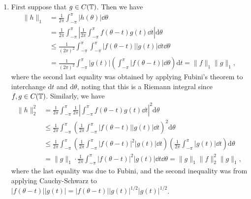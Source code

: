 \begin{pf}
\begin{enumerate}[(1)]
        \item First suppose that $g \in C(\mathbb{T})$. Then we have 
        \begin{align*}
            \|h\|_1 &= \frac{1}{2\pi} \int_{-\pi}^\pi |h(\theta)|\dd \theta \\ 
            &= \frac{1}{2\pi} \int_{-\pi}^\pi \left| \frac{1}{2\pi} \int_{-\pi}^\pi f(\theta - t) g(t)\dd t \right|\textrm{d}\theta \\ 
            &\leq \frac{1}{(2\pi)^2} \int_{-\pi}^\pi \int_{-\pi}^\pi |f(\theta - t)| |g(t)|\dd t \dd\theta \\ 
            &= \frac{1}{(2\pi)^2} \int_{-\pi}^\pi |g(t)| \left( \int_{-\pi}^\pi |f(\theta - t)|\dd\theta \right)\textrm{d}t
            = \|f\|_1 \|g\|_1,
        \end{align*}
        where the second last equality was obtained by applying Fubini's theorem
        to interchange $\textrm{d}t$ and $\textrm{d}\theta$, 
        noting that this is a Riemann integral since $f, g \in C(\mathbb{T})$. 
        Similarly, we have 
        \begin{align*}
            \|h\|_2^2 
            &= \frac{1}{2\pi} \int_{-\pi}^\pi \frac{1}{2\pi} \left| \int_{-\pi}^\pi f(\theta - t) g(t)\dd t \right|^2 \textrm{d}\theta \\ 
            &\leq \frac{1}{2\pi} \int_{-\pi}^\pi \left( \frac{1}{2\pi} \int_{-\pi}^\pi |f(\theta - t)| |g(t)|\dd t \right)^{\!2} \textrm{d}\theta \\ 
            &\leq \frac{1}{2\pi} \int_{-\pi}^\pi \left( \frac{1}{2\pi} \int_{-\pi}^\pi |f(\theta - t)|^2 |g(t)|\dd t \right) \left( \frac{1}{2\pi} \int_{-\pi}^\pi |g(t)|\dd t \right)\textrm{d}\theta \\ 
            &= \|g\|_1 \cdot \frac{1}{2\pi} \int_{-\pi}^\pi |f(\theta - t)|^2 |g(t)|\dd t \dd \theta = \|g\|_1 \|f\|_2^2 \|g\|_1, 
        \end{align*}
        where the last equality was due to Fubini, and the second inequality 
        was from applying Cauchy-Schwarz to $|f(\theta - t)||g(t)| 
        = |f(\theta - t)||g(t)|^{1/2} |g(t)|^{1/2}$. 


\end{enumerate}
\end{pf}
